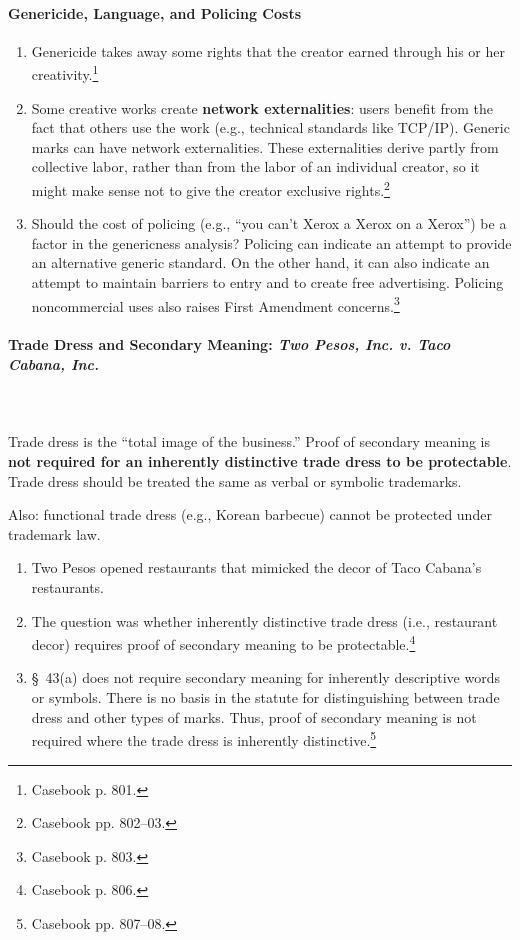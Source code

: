 \paragraph{Genericide, Language, and Policing Costs}

\begin{enumerate}
    \item Genericide takes away some rights that the creator earned through 
    his or her creativity.\footnote{Casebook p. 801.}
    \item Some creative works create \textbf{network externalities}: users 
    benefit from the fact that others use the work (e.g., technical standards 
    like TCP/IP). Generic marks can have network externalities. These 
    externalities derive partly from collective labor, rather than from the 
    labor of an individual creator, so it might make sense not to give the 
    creator exclusive rights.\footnote{Casebook pp. 802--03.}
    \item Should the cost of policing (e.g., ``you can't Xerox a Xerox on a 
    Xerox'') be a factor in the genericness analysis? Policing can indicate an 
    attempt to provide an alternative generic standard. On the other hand, it 
    can also indicate an attempt to maintain barriers to entry and to create 
    free advertising. Policing noncommercial uses also raises First Amendment 
    concerns.\footnote{Casebook p. 803.}
\end{enumerate}

\paragraph{Trade Dress and Secondary Meaning: \emph{Two Pesos, Inc. v. Taco 
Cabana, Inc.}}
~\\\\
Trade dress is the ``total image of the business.'' Proof of secondary meaning 
is \textbf{not required for an inherently distinctive trade dress to be 
protectable}. Trade dress should be treated the same as verbal or symbolic 
trademarks.

Also: functional trade dress (e.g., Korean barbecue) cannot be protected under 
trademark law.

\begin{enumerate}
    \item Two Pesos opened restaurants that mimicked the decor of Taco 
    Cabana's restaurants.
    \item The question was whether inherently distinctive trade dress (i.e., 
    restaurant decor) requires proof of secondary meaning to be 
    protectable.\footnote{Casebook p. 806.}
    \item \S\ 43(a) does not require secondary meaning for inherently 
    descriptive words or symbols. There is no basis in the statute for 
    distinguishing between trade dress and other types of marks. Thus, proof 
    of secondary meaning is not required where the trade dress is inherently 
    distinctive.\footnote{Casebook pp. 807--08.}
\end{enumerate}

